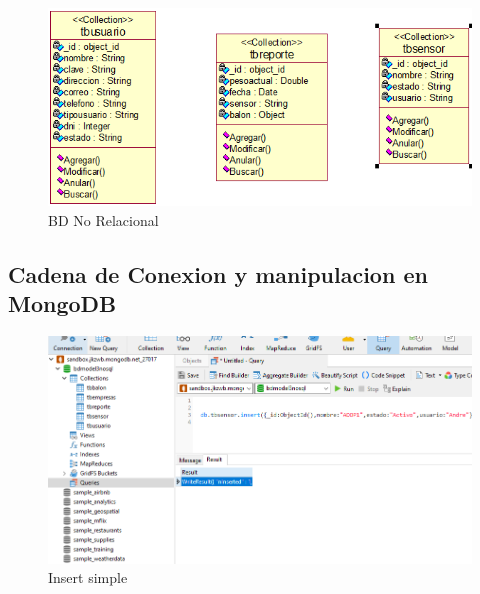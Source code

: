 \documentclass[twoside,twocolumn]{article}
\begin{document}
\begin{itemize}
\begin{figure}[h!]
\centering
\includegraphics[scale=0.35]{Image/Digrama de clases.PNG}
\caption{BD No Relacional}
\label{fig:Csha3}
\end{figure}

\subsection{Cadena de Conexion y manipulacion en MongoDB}


\begin{figure}[h!]
\centering
\includegraphics[scale=0.25]{Image/insert.PNG}
\caption{Insert simple}
\label{fig:Csha3}
\end{figure}



\end{itemize}
\end{document}
